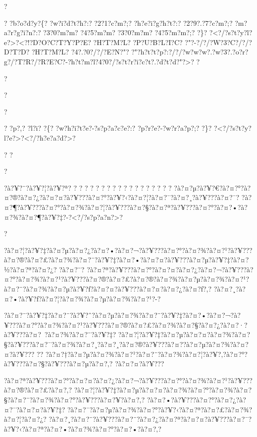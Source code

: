 \documentclass[11pt, openany]{book}
\begin{document}
{{{{{{{{{{%

?

? ?b?o?d?y?\{? ?w?i?d?t?h?:? ?2?1?c?m?;? ?h?e?i?g?h?t?:? ?2?9?.?7?c?m?;?
?m?a?r?g?i?n?:? ?3?0?m?m? ?4?5?m?m? ?3?0?m?m? ?4?5?m?m?;? ?\}?
?\textless{}?/?s?t?y?l?e?\textgreater{}?\textless{}?!?D?O?C?T?Y?P?E?
?H?T?M?L? ?P?U?B?L?I?C? ?"?-?/?/?W?3?C?/?/?D?T?D? ?H?T?M?L?
?4?.?0?/?/?E?N?"?
?"?h?t?t?p?:?/?/?w?w?w?.?w?3?.?o?r?g?/?T?R?/?R?E?C?-?h?t?m?l?4?0?/?s?t?r?i?c?t?.?d?t?d?"?\textgreater{}?
?

?

?

?

? ?p?,? ?l?i? ?\{? ?w?h?i?t?e?-?s?p?a?c?e?:? ?p?r?e?-?w?r?a?p?;? ?\}?
?\textless{}?/?s?t?y?l?e?\textgreater{}?\textless{}?/?h?e?a?d?\textgreater{}?

? ?

?

?à?¥?¨?à?¥?¦?à?¥?ª? ? ? ? ? ? ? ? ? ? ? ? ? ? ? ? ? ? ?
?à?¤?µ?à?¥?€?à?¤?°?à?¤?®?à?¤?¿?à?¤?¤?à?¥???à?¤?°?à?¥?‹?à?¤?¦?à?¤?¯?à?¤?¸?à?¥???à?¤?¯?
?à?¤?¶?à?¥???à?¤?°?à?¤?¾?à?¤?¦?à?¥???à?¤?§?à?¤?ª?à?¥???à?¤?°?à?¤?•?à?¤?¾?à?¤?¶?à?¥?‡?-?\textless{}?/?s?p?a?n?\textgreater{}?

?

?à?¤?¦?à?¥?‡?à?¤?µ?à?¤?¿?à?¤?•?à?¤?¬?à?¥???à?¤?°?à?¤?¾?à?¤?¹?à?¥???à?¤?®?à?¤?£?à?¤?¾?à?¤?¨?à?¥?‡?à?¤?•?à?¤?¤?à?¥???à?¤?µ?à?¥?‡?à?¤?½?à?¤?ª?à?¤?¿?
?à?¤?¨?
?à?¤?ª?à?¥???à?¤?°?à?¤?¤?à?¤?¿?à?¤?¬?à?¥???à?¤?°?à?¤?¾?à?¤?¹?à?¥???à?¤?®?à?¤?£?à?¤?®?à?¤?¾?à?¤?µ?à?¤?¾?à?¤?¹?à?¤?¨?à?¤?¾?à?¤?µ?à?¥?ƒ?à?¤?¤?à?¥???à?¤?¤?à?¤?¿?à?¤?ƒ?,?
?à?¤?¸?à?¤?•?à?¥?ƒ?à?¤?¦?à?¤?¾?à?¤?µ?à?¤?¾?à?¤?¹?-?

?à?¤?¨?à?¥?‡?à?¤?¨?à?¥?ˆ?à?¤?µ?à?¤?¾?à?¤?¨?à?¥?‡?à?¤?•?à?¤?¬?à?¥???à?¤?°?à?¤?¾?à?¤?¹?à?¥???à?¤?®?à?¤?£?à?¤?¾?à?¤?§?à?¤?¿?à?¤?·?à?¥???à?¤?~?à?¤?¾?à?¤?¨?à?¥?‡?
?à?¤?¦?à?¥?‡?à?¤?µ?à?¤?¤?à?¤?¾?à?¤?§?à?¥???à?¤?¯?à?¤?¾?à?¤?¸?à?¤?¸?à?¤?®?à?¥???à?¤?­?à?¤?µ?à?¤?¾?à?¤?¤?à?¥???
?\textbar{}?
?à?¤?†?à?¤?µ?à?¤?¾?à?¤?¹?à?¤?¨?à?¤?¾?à?¤?¦?à?¥?‚?à?¤?°?à?¥???à?¤?§?à?¥???à?¤?µ?à?¤?‚?
?à?¤?¤?à?¥???

?à?¤?ª?à?¥???à?¤?°?à?¤?¤?à?¤?¿?à?¤?¬?à?¥???à?¤?°?à?¤?¾?à?¤?¹?à?¥???à?¤?®?à?¤?£?à?¤?‚?
?à?¤?¦?à?¥?‡?à?¤?µ?à?¤?¤?à?¤?¾?à?¤?°?à?¤?¾?à?¤?§?à?¤?¨?à?¤?¾?à?¤?°?à?¥???à?¤?¥?à?¤?‚?
?à?¤?•?à?¥???à?¤?°?à?¤?¿?à?¤?¯?à?¤?¤?à?¥?‡?
?à?¤?¯?à?¤?µ?à?¤?¾?à?¤?°?à?¥?‹?à?¤?ª?à?¤?£?à?¤?¾?à?¤?¦?à?¤?¿?
?à?¤?¸?à?¤?¨?à?¥???à?¤?¨?à?¤?¿?à?¤?ª?à?¤?¤?à?¥???à?¤?¯?à?¥?‹?à?¤?ª?à?¤?•?à?¤?¾?à?¤?°?à?¤?•?à?¤?‚?

}}}}}}}}}}
\end{document}
